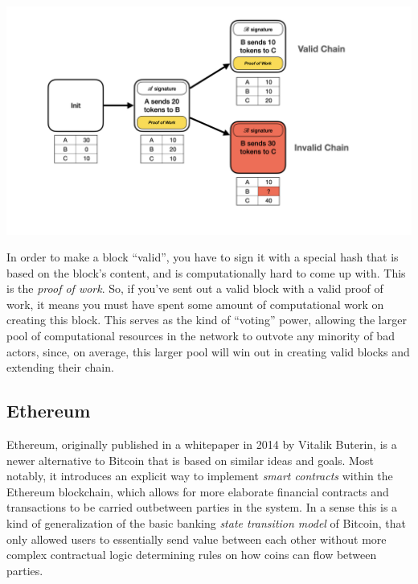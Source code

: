 \documentclass[10pt,a4paper]{article}
\begin{document}
\begin{center}
    \includegraphics[scale=0.19]{diagrams/blockchain_diagrams/blockchain_diagrams.001.png}
\end{center}

In order to make a block ``valid'', you have to sign it with a special hash that is based on the block's content, and is computationally hard to come up with. This is the \textit{proof of work}. So, if you've sent out a valid block with a valid proof of work, it means you must have spent some amount of computational work on creating this block. This serves as the kind of ``voting'' power, allowing the larger pool of computational resources in the network to outvote any minority of bad actors, since, on average, this larger pool will win out in creating valid blocks and extending their chain.


\subsection{Ethereum}

Ethereum, originally published in a whitepaper \cite{Buterin2013} in 2014 by Vitalik Buterin, is a newer alternative to Bitcoin that is based on similar ideas and goals. Most notably, it introduces an explicit way to implement \textit{smart contracts} within the Ethereum blockchain, which allows for more elaborate financial contracts and transactions to be carried outbetween parties in the system. In a sense this is a kind of generalization of the basic banking \textit{state transition model} of Bitcoin, that only allowed users to essentially send value between each other without more complex contractual logic determining rules on how coins can flow between parties.
\end{document}
